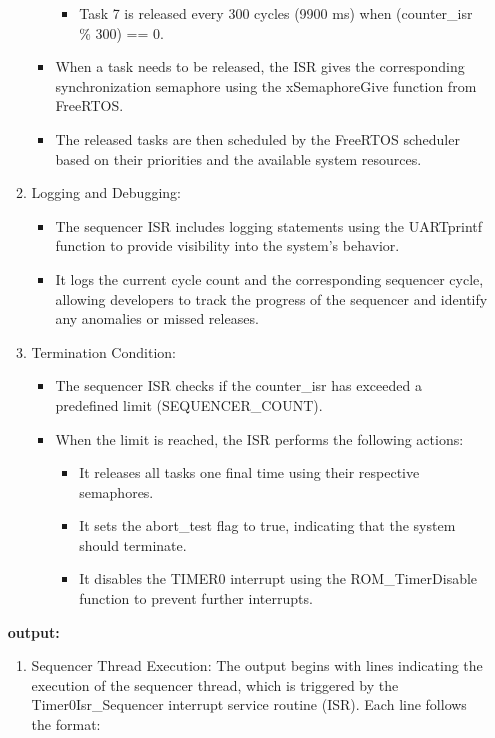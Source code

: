 \documentclass[a4paper,11pt]{article}%
\newenvironment{qanda}{\setlength{\parindent}{0pt}}{\bigskip}
\begin{document}
\begin{qanda}
\begin{enumerate}
\begin{enumerate}
\begin{itemize}
\begin{itemize}
						            \item Task 7 is released every 300 cycles (9900 ms) when (counter\_isr \% 300) == 0.
					            \end{itemize}
					      \item When a task needs to be released, the ISR gives the corresponding synchronization semaphore using the xSemaphoreGive function from FreeRTOS.
					      \item The released tasks are then scheduled by the FreeRTOS scheduler based on their priorities and the available system resources.
				      \end{itemize}
				\item Logging and Debugging:
				      \begin{itemize}
					      \item The sequencer ISR includes logging statements using the UARTprintf function to provide visibility into the system's behavior.
					      \item It logs the current cycle count and the corresponding sequencer cycle, allowing developers to track the progress of the sequencer and identify any anomalies or missed releases.
				      \end{itemize}
				\item Termination Condition:
				      \begin{itemize}
					      \item The sequencer ISR checks if the counter\_isr has exceeded a predefined limit (SEQUENCER\_COUNT).
					      \item When the limit is reached, the ISR performs the following actions:
					            \begin{itemize}
						            \item It releases all tasks one final time using their respective semaphores.
						            \item It sets the abort\_test flag to true, indicating that the system should terminate.
						            \item It disables the TIMER0 interrupt using the ROM\_TimerDisable function to prevent further interrupts.
					            \end{itemize}
				      \end{itemize}
			\end{enumerate}



			\textbf{output:}
			\begin{enumerate}
				\item Sequencer Thread Execution: The output begins with lines indicating the execution of the sequencer thread, which is triggered by the Timer0Isr\_Sequencer interrupt service routine (ISR). Each line follows the format:


\end{enumerate}
\end{enumerate}
\end{qanda}
\end{document}
